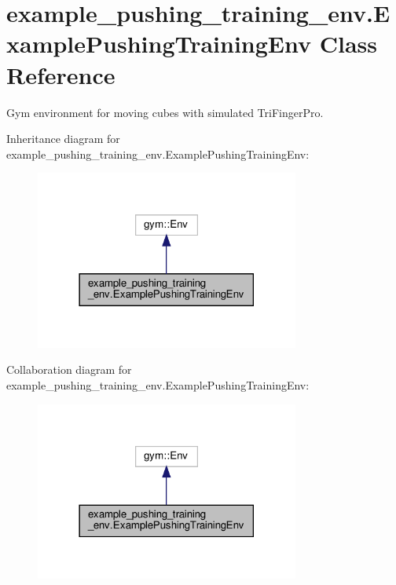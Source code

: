 \hypertarget{classexample__pushing__training__env_1_1ExamplePushingTrainingEnv}{}\section{example\+\_\+pushing\+\_\+training\+\_\+env.\+Example\+Pushing\+Training\+Env Class Reference}
\label{classexample__pushing__training__env_1_1ExamplePushingTrainingEnv}


Gym environment for moving cubes with simulated Tri\+Finger\+Pro.  




Inheritance diagram for example\+\_\+pushing\+\_\+training\+\_\+env.\+Example\+Pushing\+Training\+Env\+:
\nopagebreak
\begin{figure}[H]
\begin{center}
\leavevmode
\includegraphics[width=246pt]{classexample__pushing__training__env_1_1ExamplePushingTrainingEnv__inherit__graph}
\end{center}
\end{figure}


Collaboration diagram for example\+\_\+pushing\+\_\+training\+\_\+env.\+Example\+Pushing\+Training\+Env\+:
\nopagebreak
\begin{figure}[H]
\begin{center}
\leavevmode
\includegraphics[width=246pt]{classexample__pushing__training__env_1_1ExamplePushingTrainingEnv__coll__graph}
\end{center}
\end{figure}
